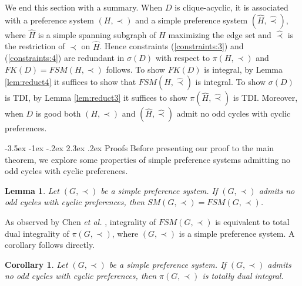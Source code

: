 \documentclass[11pt]{article}
\makeatletter
\newtheorem{lemma}[theorem]{Lemma}
\newtheorem{corollary}[theorem]{Corollary}
\numberwithin{theorem}{section}
\renewcommand\section{%
  \@startsection{section}{1}
                {\z@}%
                {-3.5ex \@plus -1ex \@minus -.2ex}%
                {2.3ex \@plus.2ex}%
                {\large\bfseries}%
}
\makeatother
\begin{document}
We end this section with a summary. When $D$ is clique-acyclic, it is associated with a preference system $(H,\prec)$ and a simple preference system $(\hat{H},\hat\prec)$, where $\hat{H}$ is a simple spanning subgraph of $H$ maximizing the edge set and $\hat\prec$ is the restriction of $\prec$ on $\hat{H}$.
Hence constraints (\ref{constraints:3}) and (\ref{constraints:4}) are redundant in $\sigma(D)$ with respect to $\pi(H,\prec)$ and $FK(D)=FSM(H,\prec)$ follows. To show $FK(D)$ is integral, by Lemma \ref{lem:reduct4} it suffices to show that $FSM(\hat{H},\hat\prec)$ is integral. To show $\sigma(D)$ is TDI, by Lemma \ref{lem:reduct3} it suffices to show $\pi(\hat{H},\hat\prec)$ is TDI. Moreover, when $D$ is good both $(H,\prec)$ and $(\hat{H},\hat\prec)$ admit no odd cycles with cyclic preferences.

\section{Proofs}
Before presenting our proof to the main theorem, we explore some properties of simple preference systems admitting no odd cycles with cyclic preferences.
\begin{lemma}
\label{lem:prf1}
Let $(G,\prec)$ be a simple preference system. If $(G,\prec)$ admits no odd cycles with cyclic preferences, then $SM(G,\prec)=FSM(G,\prec)$.
\end{lemma}

As observed by Chen \textit{et al.} \cite{ChenDing12}, integrality of $FSM(G,\prec)$ is equivalent to total dual integrality of $\pi(G,\prec)$, where $(G,\prec)$ is a simple preference system. A corollary follows directly.

\begin{corollary}
\label{cor:prf2}
Let $(G,\prec)$ be a simple preference system. If $(G,\prec)$ admits no odd cycles with cyclic preferences, then $\pi(G,\prec)$ is totally dual integral.
\end{corollary}
\end{document}
